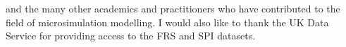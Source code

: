  and the many other academics and practitioners who have contributed to the field of microsimulation modelling. I would also like to thank the UK Data Service for providing access to the FRS and SPI datasets.